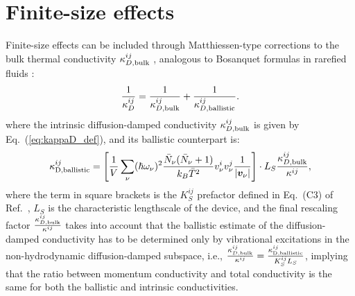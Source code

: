 \documentclass[
prb,
twocolumn,
superscriptaddress,
 amsmath,amssymb,
 aps,
longbibliography,
]{revtex4-2}
\newcommand*{\state}{\ensuremath{\nu}}
\begin{document}
\section{Finite-size effects}
\label{sub:finite_size}

Finite-size effects can be included through Matthiessen-type corrections to the bulk thermal conductivity $\kappa_{D, \rm bulk}^{ij}$ \cite{ziman1960electrons,Simoncelli2020}, analogous to Bosanquet formulas in rarefied fluids \cite{michalis_rarefaction_2010}:
\begin{equation}
\frac{1}{\kappa^{ij}_D}=\frac{1}{\kappa^{ij}_{D, \rm bulk}}+\frac{1}{\kappa^{ij}_{D,\mathrm{ballistic}}}.
  \label{eq:conductivity_comb}
\end{equation}
where the intrinsic diffusion-damped conductivity $\kappa^{ij}_{D, \rm bulk}$ is given by Eq.~(\ref{eq:kappaD_def}), and its ballistic counterpart is:
\begin{equation}
	\kappa^{{ij}}_{\rm D,ballistic}=
	\left[\frac{1}{V}\sum_\state (\hbar \omega_\state)^2 \frac{\bar{N}_\state(\bar{N}_\state+1)}{k_B \bar{T}^2}v^{{i}}_\state v^j_\state \frac{1}{|\bm{v}_{\state}|}
	\right]
	\cdot L_S\frac{\kappa^{ij}_{D, \rm bulk}}{\kappa^{ij}},
   \label{eq:conductivity_fs}
\end{equation}
where the term in square brackets is the $K^{ij}_S$ prefactor defined in Eq.~(C3) of Ref.~\cite{Simoncelli2020}, $L_S$ is the characteristic lengthscale of the device, and the final rescaling factor $\frac{\kappa^{ij}_{D, \rm bulk}}{\kappa^{ij}}$ takes into account
that the ballistic estimate of the diffusion-damped conductivity has to be determined only by vibrational excitations in the non-hydrodynamic diffusion-damped subspace, i.e., $\frac{\kappa^{ij}_{D, \rm bulk}}{\kappa^{ij}}=\frac{\kappa^{{ij}}_{\rm D,ballistic}}{K^{ij}_S L_S}$, implying that the ratio between momentum conductivity and total conductivity is the same for both the ballistic and intrinsic conductivities.
\end{document}
